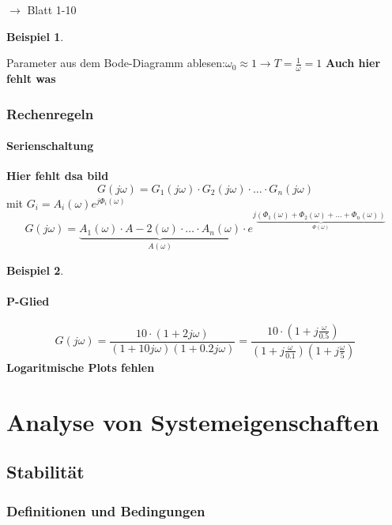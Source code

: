 \documentclass[12pt,a4paper,ngerman]{scrartcl}
\newtheorem{bsp}{Beispiel}[section] %
\begin{document}
$\rightarrow$ Blatt 1-10
\begin{bsp}
\end{bsp}
Parameter aus dem Bode-Diagramm ablesen:$\omega_0 \approx 1 \rightarrow T=\frac{1}{\omega}=1$
\textbf{Auch hier fehlt was}
\subsubsection{Rechenregeln}

\paragraph{Serienschaltung}

\textbf{Hier fehlt dsa bild}
\[
G(j\omega)=G_1(j\omega)\cdot G_2(j\omega)\cdot \dots \cdot G_n(j\omega)
\]
mit $G_i = A_i(\omega)e^{j\Phi_i(\omega)}$\\
\[
G(j\omega)=\underbrace{A_1(\omega)\cdot A-2(\omega)\cdot \dots \cdot A_n(\omega)}_{A(\omega)}\cdot e^{j\underbrace{(\Phi_1(\omega)+\Phi_2(\omega)+\dots + \Phi_n(\omega))}_{\Phi(\omega)}}
\]
\begin{bsp}
\end{bsp}

\paragraph{P-Glied}
\[
G(j\omega)=\frac{10\cdot(1+2j\omega)}{(1+10j\omega)(1+0.2j\omega)}=\frac{10\cdot (1+j\frac{\omega}{0.5})}{(1+j\frac{\omega}{0.1})(1+j\frac{\omega}{5})}
\]
\textbf{Logaritmische Plots fehlen}

\section{Analyse von Systemeigenschaften}

\subsection{Stabilität}

\subsubsection{Definitionen und Bedingungen}
\end{document}

